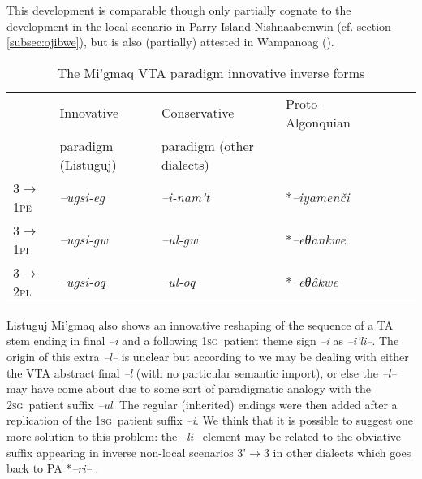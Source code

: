 \documentclass[twoside,a4paper,11pt]{article}
\newcommand{\ipa}[1]{{\phon\textit{#1}}}
\newcommand{\sg}{\textsc{sg}}
\newcommand{\pl}{\textsc{pl}}
\newcommand{\grise}[1]{\cellcolor{lightgray}\textbf{#1}}
\newcommand{\Σ}{\greek{Σ}}
\newcommand{\pli}{\textsc{pi}}
\newcommand{\pe}{\textsc{pe}}
\begin{document}
This development is comparable though only partially cognate to the development in the local scenario in Parry Island Nishnaabemwin (cf. section \ref{subsec:ojibwe}), but is also (partially) attested in Wampanoag (\citealp[556]{bragdon}).

\begin{table}[H]
\caption{The Mi'gmaq VTA paradigm innovative inverse forms}
\centering \label{tab:migmaq.vta.innov}
\begin{tabular}{lllllll}
\toprule
& Innovative & Conservative & Proto-Algonquian \\
&paradigm (Listuguj) & paradigm (other dialects) &\\
\midrule
3$\rightarrow$1\pe & 	\ipa{--ugsi-eg} \grise{}& 	\ipa{--i-nam't} &  *\ipa{--iyamenči} & 		\\
\textsc{3$\rightarrow$1\pli} & 	\ipa{--ugsi-gw} \grise{}& 	\ipa{--ul-gw}  &*\ipa{--eθankwe} & 		\\
\midrule
3$\rightarrow$2\pl & \ipa{--ugsi-oq} \grise{}& 	\ipa{--ul-oq} & *\ipa{--eθâkwe} & 		\\
\bottomrule
\end{tabular}
\end{table}

Listuguj Mi'gmaq also shows an innovative reshaping of the sequence of a TA stem ending in final \ipa{--i} and a following 1\sg\ patient theme sign \ipa{--i} as \ipa{--i'li--}. The origin of this extra \ipa{--l--} is unclear but according to \cite{Quinn12} we may be dealing with either the VTA abstract final \ipa{--l} (with no particular semantic import), or else the \ipa{--l--} may have come about due to some sort of paradigmatic analogy with the 2\sg\ patient suffix \ipa{--ul}. The regular (inherited) endings were then added after a replication of the 1\sg\ patient suffix \ipa{--i}. We think that it is possible to suggest one more solution to this problem: the \ipa{--li--} element may be related to the obviative suffix appearing in inverse non-local scenarios 3'$\rightarrow$3 in other dialects which goes back to PA *\ipa{--ri--} .
\end{document}
